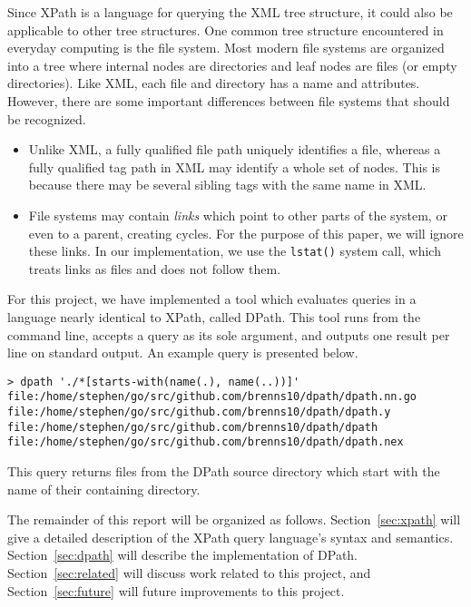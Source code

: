 \documentclass{scrartcl}
\begin{document}
Since XPath is a language for querying the XML tree structure, it could also be
applicable to other tree structures. One common tree structure encountered in
everyday computing is the file system. Most modern file systems are organized
into a tree where internal nodes are directories and leaf nodes are files (or
empty directories). Like XML, each file and directory has a name and attributes.
However, there are some important differences between file systems that should
be recognized.

\begin{itemize}
\item Unlike XML, a fully qualified file path uniquely identifies a file,
  whereas a fully qualified tag path in XML may identify a whole set of nodes.
  This is because there may be several sibling tags with the same name in XML.
\item File systems may contain \emph{links} which point to other parts of the
  system, or even to a parent, creating cycles. For the purpose of this paper,
  we will ignore these links. In our implementation, we use the \texttt{lstat()}
  system call, which treats links as files and does not follow them.
\end{itemize}

For this project, we have implemented a tool which evaluates queries in a
language nearly identical to XPath, called DPath. This tool runs from the
command line, accepts a query as its sole argument, and outputs one result per
line on standard output. An example query is presented below.

\begin{lstlisting}
> dpath './*[starts-with(name(.), name(..))]'
file:/home/stephen/go/src/github.com/brenns10/dpath/dpath.nn.go
file:/home/stephen/go/src/github.com/brenns10/dpath/dpath.y
file:/home/stephen/go/src/github.com/brenns10/dpath/dpath
file:/home/stephen/go/src/github.com/brenns10/dpath/dpath.nex
\end{lstlisting}

This query returns files from the DPath source directory which start with the
name of their containing directory.

The remainder of this report will be organized as follows.
Section~\ref{sec:xpath} will give a detailed description of the XPath query
language's syntax and semantics. Section~\ref{sec:dpath} will describe the
implementation of DPath. Section~\ref{sec:related} will discuss work related to
this project, and Section~\ref{sec:future} will future improvements to this
project.
\end{document}
